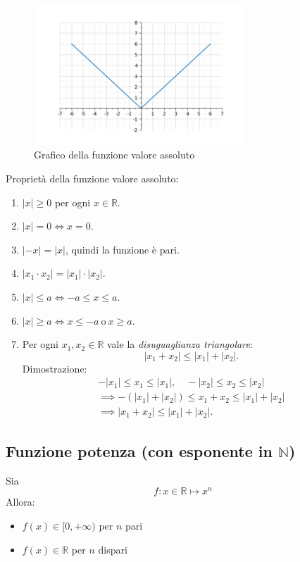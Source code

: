 \documentclass[oneside,10pt]{book} %
\begin{document}
\begin{figure}[h]
    \centering
    \includegraphics[width=0.7\textwidth]{./img/funzione_valore_assoluto.png}
    \caption{Grafico della funzione valore assoluto}
    \label{fig:funzione_valore_assoluto}
\end{figure}


  

Proprietà della funzione valore assoluto:
\begin{enumerate}
    \item $|x| \ge 0$ per ogni $x \in \mathbb{R}$.
    \item $|x| = 0 \iff x = 0$.
    \item $|-x| = |x|$, quindi la funzione è pari.
    \item $|x_1 \cdot x_2| = |x_1| \cdot |x_2|$.
    \item $|x| \le a \iff -a \le x \le a$.
    \item $|x| \ge a \iff x \le -a \ \text{o} \ x \ge a$.
    \item Per ogni $x_1, x_2 \in \mathbb{R}$ vale la \emph{disuguaglianza triangolare}:
    \[
    |x_1 + x_2| \le |x_1| + |x_2|.
    \]
    Dimostrazione:
    \begin{align*}
    -|x_1| \le x_1 \le |x_1|, \quad -|x_2| \le x_2 \le |x_2| \\
    \implies -(|x_1| + |x_2|) \le x_1 + x_2 \le |x_1| + |x_2| \\
    \implies |x_1 + x_2| \le |x_1| + |x_2|.
    \end{align*}
  \end{enumerate}
\subsection{Funzione potenza (con esponente in $\mathbb{N}$)}

Sia
\[
f: x \in \mathbb{R} \mapsto x^n
\]
Allora:
\begin{itemize}
  \item $f(x) \in [0, +\infty)$ per $n$ pari
  \item $f(x) \in \mathbb{R}$ per $n$ dispari
\end{itemize}
\end{document}
